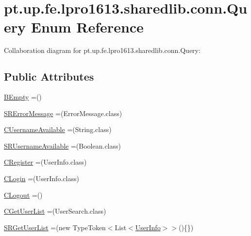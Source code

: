\hypertarget{enumpt_1_1up_1_1fe_1_1lpro1613_1_1sharedlib_1_1conn_1_1_query}{}\section{pt.\+up.\+fe.\+lpro1613.\+sharedlib.\+conn.\+Query Enum Reference}
\label{enumpt_1_1up_1_1fe_1_1lpro1613_1_1sharedlib_1_1conn_1_1_query}


Collaboration diagram for pt.\+up.\+fe.\+lpro1613.\+sharedlib.\+conn.\+Query\+:
\subsection*{Public Attributes}
\begin{DoxyCompactItemize}
\item 
\hyperlink{enumpt_1_1up_1_1fe_1_1lpro1613_1_1sharedlib_1_1conn_1_1_query_aa5301799b1d3143c374798784ac198ea}{B\+Empty} =()
\item 
\hyperlink{enumpt_1_1up_1_1fe_1_1lpro1613_1_1sharedlib_1_1conn_1_1_query_a734b96bcfdfad05b25de2a39e20528a9}{S\+R\+Error\+Message} =(Error\+Message.\+class)
\item 
\hyperlink{enumpt_1_1up_1_1fe_1_1lpro1613_1_1sharedlib_1_1conn_1_1_query_ae39b52f0f15ed78e237e84aa822c9a81}{C\+Username\+Available} =(String.\+class)
\item 
\hyperlink{enumpt_1_1up_1_1fe_1_1lpro1613_1_1sharedlib_1_1conn_1_1_query_a0634c9c72d7ac829d414fdc13f34bddd}{S\+R\+Username\+Available} =(Boolean.\+class)
\item 
\hyperlink{enumpt_1_1up_1_1fe_1_1lpro1613_1_1sharedlib_1_1conn_1_1_query_aa654294e91df382d4d478f1ccddea77b}{C\+Register} =(User\+Info.\+class)
\item 
\hyperlink{enumpt_1_1up_1_1fe_1_1lpro1613_1_1sharedlib_1_1conn_1_1_query_a7b5129f1a1c06d802f15b47b5510e83c}{C\+Login} =(User\+Info.\+class)
\item 
\hyperlink{enumpt_1_1up_1_1fe_1_1lpro1613_1_1sharedlib_1_1conn_1_1_query_aa40f948ae79a2adcea748969432f2ab3}{C\+Logout} =()
\item 
\hyperlink{enumpt_1_1up_1_1fe_1_1lpro1613_1_1sharedlib_1_1conn_1_1_query_ae3af9d0613ab8d210b7161a550f7bf14}{C\+Get\+User\+List} =(User\+Search.\+class)
\item 
\hyperlink{enumpt_1_1up_1_1fe_1_1lpro1613_1_1sharedlib_1_1conn_1_1_query_ad743a85e754f5d1d070fe30d8cf1ae25}{S\+R\+Get\+User\+List} =(new Type\+Token$<$List$<$\hyperlink{classpt_1_1up_1_1fe_1_1lpro1613_1_1sharedlib_1_1tuples_1_1_user_info}{User\+Info}$>$$>$()\{\})
$$
\end{DoxyCompactItemize}
